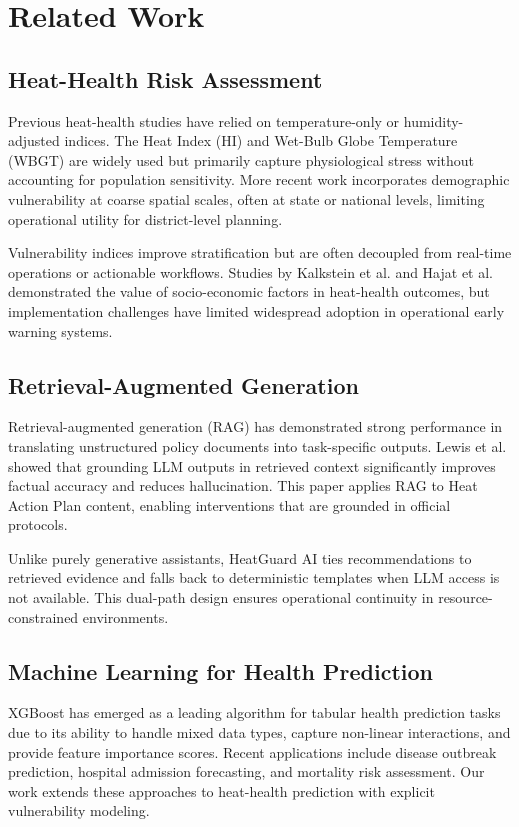 \documentclass[conference]{IEEEtran}
\begin{document}
\section{Related Work}
\label{sec:relatedwork}

\subsection{Heat-Health Risk Assessment}
Previous heat-health studies have relied on temperature-only or humidity-adjusted indices. The Heat Index (HI) and Wet-Bulb Globe Temperature (WBGT) are widely used but primarily capture physiological stress without accounting for population sensitivity. More recent work incorporates demographic vulnerability at coarse spatial scales, often at state or national levels, limiting operational utility for district-level planning.

Vulnerability indices improve stratification but are often decoupled from real-time operations or actionable workflows. Studies by Kalkstein et al.\cite{kalkstein} and Hajat et al.\cite{hajat} demonstrated the value of socio-economic factors in heat-health outcomes, but implementation challenges have limited widespread adoption in operational early warning systems.

\subsection{Retrieval-Augmented Generation}
Retrieval-augmented generation (RAG) has demonstrated strong performance in translating unstructured policy documents into task-specific outputs. Lewis et al.\cite{rag} showed that grounding LLM outputs in retrieved context significantly improves factual accuracy and reduces hallucination. This paper applies RAG to Heat Action Plan content, enabling interventions that are grounded in official protocols.

Unlike purely generative assistants, HeatGuard AI ties recommendations to retrieved evidence and falls back to deterministic templates when LLM access is not available. This dual-path design ensures operational continuity in resource-constrained environments.

\subsection{Machine Learning for Health Prediction}
XGBoost\cite{xgboost} has emerged as a leading algorithm for tabular health prediction tasks due to its ability to handle mixed data types, capture non-linear interactions, and provide feature importance scores. Recent applications include disease outbreak prediction, hospital admission forecasting, and mortality risk assessment. Our work extends these approaches to heat-health prediction with explicit vulnerability modeling.
\end{document}
